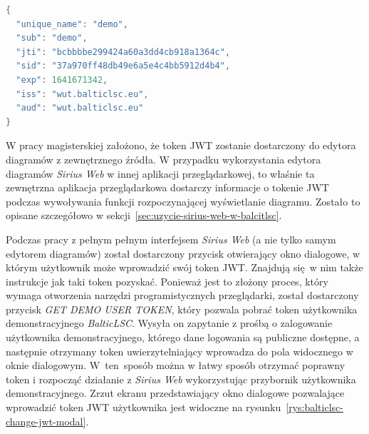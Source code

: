 \begin{lstlisting}[float,
    floatplacement=hb,
    language=java,
    caption={Zawartość pola z danymi w tokenie \gls{JWT} z serwisu
      \emph{BalticLSC}.},
    label={lst:balticlsc-jwt-payload}]
{
  "unique_name": "demo",
  "sub": "demo",
  "jti": "bcbbbbe299424a60a3dd4cb918a1364c",
  "sid": "37a970ff48db49e6a5e4c4bb5912d4b4",
  "exp": 1641671342,
  "iss": "wut.balticlsc.eu",
  "aud": "wut.balticlsc.eu"
}
\end{lstlisting}

W pracy magisterskiej założono, że token \gls{JWT} zostanie dostarczony do
edytora diagramów z zewnętrznego źródła. W przypadku wykorzystania edytora
diagramów \emph{Sirius Web} w innej aplikacji przeglądarkowej, to właśnie ta
zewnętrzna aplikacja przeglądarkowa dostarczy informacje o tokenie \gls{JWT}
podczas wywoływania funkcji rozpoczynającej wyświetlanie diagramu. Zostało to
opisane szczegółowo w sekcji~\ref{sec:uzycie-sirius-web-w-balcitlsc}.

Podczas pracy z pełnym pełnym interfejsem \emph{Sirius Web} (a nie tylko samym
edytorem diagramów) został dostarczony przycisk otwierający okno
dialogowe, w którym użytkownik może wprowadzić swój token \gls{JWT}. Znajdują
się w nim także instrukcje jak taki token pozyskać. Ponieważ jest to złożony
proces, który wymaga otworzenia narzędzi programistycznych przeglądarki, został
dostarczony przycisk \emph{GET DEMO USER TOKEN}, który
pozwala pobrać token użytkownika demonstracyjnego \emph{BalticLSC}.
Wysyła on zapytanie z prośbą o zalogowanie użytkownika demonstracyjnego,
którego dane logowania są publiczne dostępne, a następnie otrzymany token
uwierzytelniający wprowadza do pola widocznego w oknie dialogowym. W~ten~sposób
można w łatwy sposób otrzymać poprawny token i rozpocząć działanie z
\emph{Sirius Web} wykorzystując przybornik użytkownika demonstracyjnego.
Zrzut ekranu przedstawiający okno dialogowe pozwalające wprowadzić token
\gls{JWT} użytkownika jest widoczne na
rysunku~\ref{rys:balticlsc-change-jwt-modal}.

